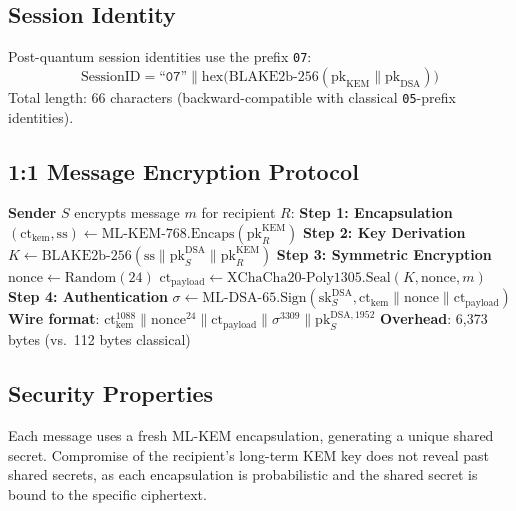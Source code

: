 \documentclass[11pt,letterpaper]{article}
\begin{document}
\subsection{Session Identity}

Post-quantum session identities use the prefix \texttt{07}:
\[
\text{SessionID} = \texttt{``07''} \| \text{hex}\big(\text{BLAKE2b-256}(\text{pk}_{\text{KEM}} \| \text{pk}_{\text{DSA}})\big)
\]
Total length: 66 characters (backward-compatible with classical \texttt{05}-prefix identities).

\subsection{1:1 Message Encryption Protocol}

\begin{algorithm}[H]
\caption{SessionVM Post-Quantum Message Encryption}
\begin{algorithmic}[1]
\State \textbf{Sender} $S$ encrypts message $m$ for recipient $R$:
\Statex
\State \textbf{Step 1: Encapsulation}
\State $(\text{ct}_{\text{kem}}, \text{ss}) \gets \text{ML-KEM-768.Encaps}(\text{pk}_R^{\text{KEM}})$
\Statex
\State \textbf{Step 2: Key Derivation}
\State $K \gets \text{BLAKE2b-256}(\text{ss} \| \text{pk}_S^{\text{DSA}} \| \text{pk}_R^{\text{KEM}})$
\Statex
\State \textbf{Step 3: Symmetric Encryption}
\State $\text{nonce} \gets \text{Random}(24)$
\State $\text{ct}_{\text{payload}} \gets \text{XChaCha20-Poly1305.Seal}(K, \text{nonce}, m)$
\Statex
\State \textbf{Step 4: Authentication}
\State $\sigma \gets \text{ML-DSA-65.Sign}(\text{sk}_S^{\text{DSA}}, \text{ct}_{\text{kem}} \| \text{nonce} \| \text{ct}_{\text{payload}})$
\Statex
\State \textbf{Wire format}:
\State $\text{ct}_{\text{kem}}^{1088} \| \text{nonce}^{24} \| \text{ct}_{\text{payload}} \| \sigma^{3309} \| \text{pk}_S^{\text{DSA},1952}$
\State \textbf{Overhead}: 6,373 bytes (vs.\ 112 bytes classical)
\end{algorithmic}
\end{algorithm}

\subsection{Security Properties}

\begin{theorem}
Each message uses a fresh ML-KEM encapsulation, generating a unique shared secret. Compromise of the recipient's long-term KEM key does not reveal past shared secrets, as each encapsulation is probabilistic and the shared secret is bound to the specific ciphertext.
\end{theorem}
\end{document}
